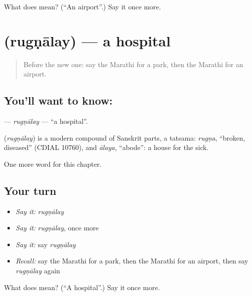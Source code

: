 \begin{tcolorbox}[breakable,colback=teal!4,colframe=teal!35!black,title={Before you move on}]
What does  mean? (\textquotedblleft{}An airport\textquotedblright{}.) Say it once more.
\end{tcolorbox}
\section[\texorpdfstring{\mr{रुग्णालय} (rugṇālay)}{रुग्णालय (rugṇālay)}]{ (rugṇālay) — a hospital}

\label{lesson:MR-C128-rugnalay}



\begin{quote}
Before the new one: say the Marathi for a park, then the Marathi for an airport.
\end{quote}

\subsection*{You'll want to know: }
\textbf{} — \emph{rugṇālay} — \textquotedblleft{}a hospital\textquotedblright{}.

\begin{cousinweb}
\textbf{} (\emph{rugṇālay}) is a modern compound of Sanskrit parts, a tatsama: \emph{rugṇa}, \textquotedblleft{}broken, diseased\textquotedblright{} (CDIAL 10760), and \emph{ālaya}, \textquotedblleft{}abode\textquotedblright{}: a house for the sick.
\end{cousinweb}

\begin{grammarlens}[title={What you've built}]
One more word for this chapter.
\end{grammarlens}

\subsection*{Your turn}
\begin{itemize}
\raggedright
  \item \emph{Say it:} \emph{rugṇālay}
  \item \emph{Say it:} \emph{rugṇālay}, once more
  \item \emph{Say it:} say \emph{rugṇālay}
  \item \emph{Recall:} say the Marathi for a park, then the Marathi for an airport, then say \emph{rugṇālay} again
\end{itemize}

\begin{tcolorbox}[breakable,colback=teal!4,colframe=teal!35!black,title={Before you move on}]
What does  mean? (\textquotedblleft{}A hospital\textquotedblright{}.) Say it once more.
\end{tcolorbox}
